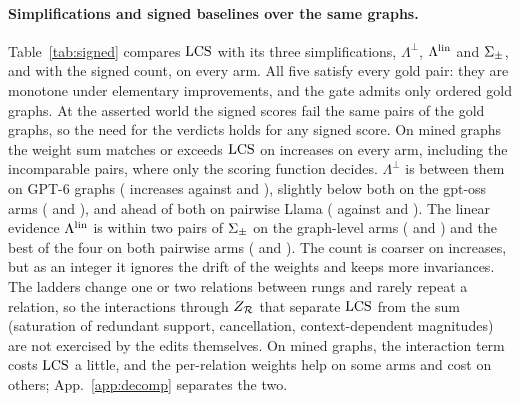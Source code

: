 \paragraph{Simplifications and signed baselines over the same graphs.} Table~\ref{tab:signed}
compares $\mathrm{LCS}$ with its three simplifications, $\Lambda^{\perp}$, $\Lambda^{\mathrm{lin}}$ and $\Sigma_{\pm}$, and with the
signed count, on every arm. All five satisfy every gold pair: they are monotone under elementary
improvements, and the gate admits only ordered gold graphs. At the asserted world the signed scores
fail the same \sThreeGoldWsumASign{}  pairs of the gold graphs, so the need for the verdicts
holds for any signed score. On mined graphs the weight sum matches or exceeds $\mathrm{LCS}$ on increases
on every arm, including the incomparable pairs, where only the scoring function decides.
$\Lambda^{\perp}$ is between them on GPT-6 graphs (\sThreeGraphGptIndepInc{} increases against
\sThreeGraphGptLamInc{} and \sThreeGraphGptWsumInc), slightly below both on the gpt-oss arms
(\sThreeGraphOssIndepInc{} and \sThreePairOssIndepInc), and ahead of both on pairwise Llama
(\sThreePairLlamaIndepInc{} against \sThreePairLlamaLamInc{} and \sThreePairLlamaWsumInc). The linear evidence $\Lambda^{\mathrm{lin}}$ is within two pairs of $\Sigma_{\pm}$ on the graph-level arms
(\sThreeGraphGptLinInc{} and \sThreeGraphOssLinInc) and the best of the four on both pairwise arms
(\sThreePairOssLinInc{} and \sThreePairLlamaLinInc). The count is coarser on increases, but as an integer it ignores the drift of the weights
and keeps more invariances. The ladders change one or two relations between rungs and rarely
repeat a relation, so the interactions through $Z_{\mathcal{R}}$ that separate $\mathrm{LCS}$ from the sum
(saturation of redundant support, cancellation, context-dependent magnitudes) are not exercised by
the edits themselves. On mined graphs, the interaction term costs $\mathrm{LCS}$ a little, and the
per-relation weights help on some arms and cost on others; App.~\ref{app:decomp} separates the two.

